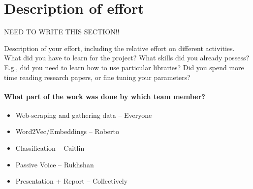 \documentclass{article}
\begin{document}
\section{Description of effort}{

NEED TO WRITE THIS SECTION!!

Description of your effort, including the relative effort on different activities. 
What did you have to learn for the project? 
What skills did you already possess? E.g., did you need to learn how to use particular libraries? Did you spend more time reading research papers, or fine tuning your parameters? 

\paragraph{What part of the work was done by which team member?}{
\begin{itemize}
  \item Web-scraping and gathering data – Everyone
  \item Word2Vec/Embeddings – Roberto
  \item Classification – Caitlin
  \item Passive Voice – Rukhshan
  \item Presentation + Report – Collectively
\end{itemize}

}
}

\newpage
\end{document}

